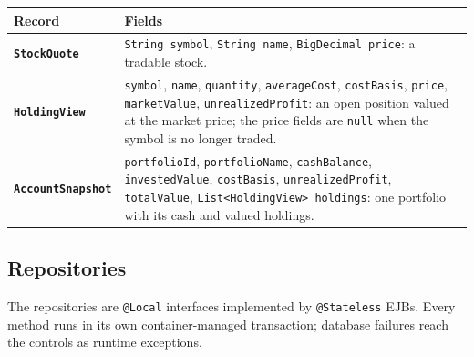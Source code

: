 \documentclass[12pt,a4paper]{article}
\newcommand{\code}[1]{\texttt{\small #1}}
\newcommand{\class}[1]{\textbf{\code{#1}}}
\begin{document}
\begin{longtable}{>{\raggedright\arraybackslash}p{3.2cm}
                  >{\raggedright\arraybackslash}p{10.3cm}}
\toprule
\textbf{Record} & \textbf{Fields}\\
\midrule
\endhead
\class{StockQuote} & \code{String symbol}, \code{String name},
\code{BigDecimal price}: a tradable stock.\\
\class{HoldingView} & \code{symbol}, \code{name}, \code{quantity},
\code{averageCost}, \code{costBasis}, \code{price}, \code{marketValue},
\code{unrealizedProfit}: an open position valued at the market price; the
price fields are \code{null} when the symbol is no longer traded.\\
\class{AccountSnapshot} & \code{portfolioId}, \code{portfolioName},
\code{cashBalance}, \code{investedValue}, \code{costBasis},
\code{unrealizedProfit}, \code{totalValue}, \code{List<HoldingView>
holdings}: one portfolio with its cash and valued holdings.\\
\bottomrule
\end{longtable}

\subsection{Repositories}

The repositories are \code{@Local} interfaces implemented by
\code{@Stateless} EJBs. Every method runs in its own container-managed
transaction; database failures reach the controls as runtime exceptions.
\end{document}
